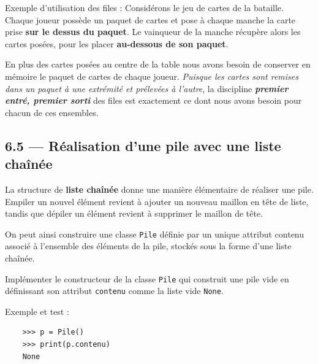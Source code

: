 \documentclass[a4paper,17pt]{extarticle}
\begin{document}
    Exemple d'utilisation des files : Considérons le jeu de cartes de la
bataille. Chaque joueur possède un paquet de cartes et pose à chaque
manche la carte prise \textbf{sur le dessus du paquet}. Le vainqueur de
la manche récupère alors les cartes posées, pour les placer
\textbf{au-dessous de son paquet}.

En plus des cartes posées au centre de la table nous avons besoin de
conserver en mémoire le paquet de cartes de chaque joueur. \emph{Puisque
les cartes sont remises dans un paquet à une extrémité et prélevées à
l'autre}, la discipline \textbf{\emph{premier entré, premier sorti}} des
files est exactement ce dont nous avons besoin pour chacun de ces
ensembles.

    \hypertarget{ruxe9alisation-dune-pile-avec-une-liste-chauxeenuxe9e}{%
\subsection{6.5 --- Réalisation d'une pile avec une liste
chaînée}\label{ruxe9alisation-dune-pile-avec-une-liste-chauxeenuxe9e}}

    La structure de \textbf{liste chaînée} donne une manière élémentaire de
réaliser une pile. Empiler un nouvel élément revient à ajouter un
nouveau maillon en tête de liste, tandis que dépiler un élément revient
à supprimer le maillon de tête.

On peut ainsi construire une classe \texttt{Pile} définie par un unique
attribut contenu associé à l'ensemble des éléments de la pile, stockés
sous la forme d'une liste chaînée.

    Implémenter le constructeur de la classe \texttt{Pile} qui construit une
pile vide en définissant son attribut \texttt{contenu} comme la liste
vide \texttt{None}.

Exemple et test :

\begin{verbatim}
    >>> p = Pile()
    >>> print(p.contenu)
    None
\end{verbatim}
\end{document}
